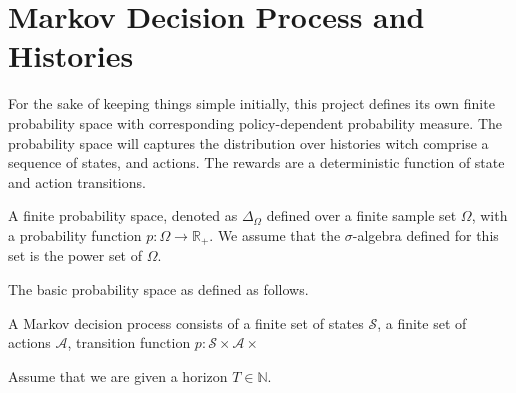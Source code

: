 %

\newcommand{\Nats}{\mathbb{N}}
\newcommand{\Real}{\mathbb{R}}


\section{Markov Decision Process and Histories}

For the sake of keeping things simple initially, this project defines its own finite probability space with corresponding policy-dependent probability measure. The probability space will captures the distribution over histories witch comprise a sequence of states, and actions. The rewards are a deterministic function of state and action transitions. 

\begin{definition}
A finite probability space, denoted as $\Delta_{\Omega}$ defined over a finite sample set $\Omega$, with a probability function $p\colon \Omega \to \Real_+$. We assume that the $\sigma$-algebra defined for this set is the power set of $\Omega$.
   \lean{\Delta}
  \leanok
\end{definition}


The basic probability space as defined as follows.
\begin{definition}
  A Markov decision process consists of a finite set of states $\mathcal{S}$, a finite set of actions $\mathcal{A}$, transition function $p\colon \mathcal{S} \times \mathcal{A} \times $
  \leanok
\end{definition}

Assume that we are given a horizon $T \in \Nats$.
\begin{definition}[History]
  
\end{definition}

